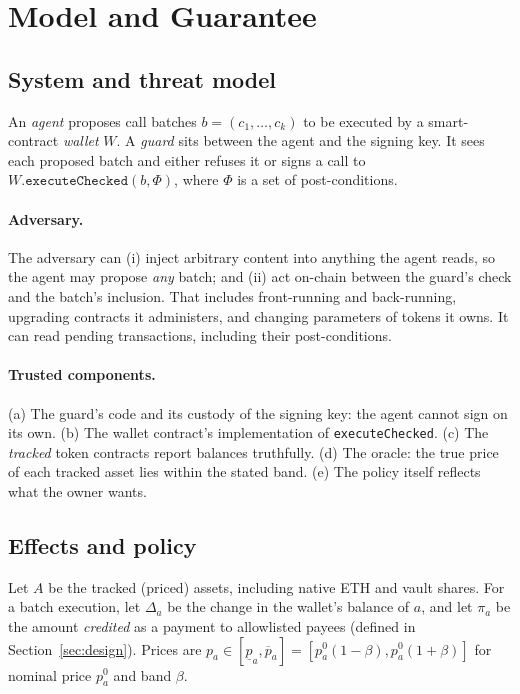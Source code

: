 \documentclass[11pt]{article}
\begin{document}
\section{Model and Guarantee}
\label{sec:model}

\subsection{System and threat model}
An \emph{agent} proposes call batches $b=(c_1,\dots,c_k)$ to be executed by a smart-contract \emph{wallet} $W$. A \emph{guard} sits between the agent and the signing key. It sees each proposed batch and either refuses it or signs a call to $W.\texttt{executeChecked}(b,\Phi)$, where $\Phi$ is a set of post-conditions.

\paragraph{Adversary.} The adversary can (i) inject arbitrary content into anything the agent reads, so the agent may propose \emph{any} batch; and (ii) act on-chain between the guard's check and the batch's inclusion. That includes front-running and back-running, upgrading contracts it administers, and changing parameters of tokens it owns. It can read pending transactions, including their post-conditions.

\paragraph{Trusted components.} (a) The guard's code and its custody of the signing key: the agent cannot sign on its own. (b) The wallet contract's implementation of \texttt{executeChecked}. (c) The \emph{tracked} token contracts report balances truthfully. (d) The oracle: the true price of each tracked asset lies within the stated band. (e) The policy itself reflects what the owner wants.

\subsection{Effects and policy}
Let $A$ be the tracked (priced) assets, including native ETH and vault shares. For a batch execution, let $\Delta_a$ be the change in the wallet's balance of $a$, and let $\pi_a$ be the amount \emph{credited} as a payment to allowlisted payees (defined in Section~\ref{sec:design}). Prices are $p_a\in[\underline p_a,\overline p_a]=[p^0_a(1-\beta),p^0_a(1+\beta)]$ for nominal price $p^0_a$ and band $\beta$.
\end{document}
